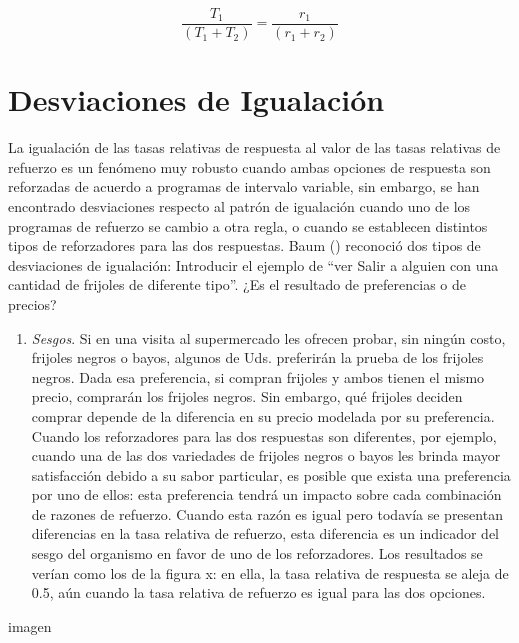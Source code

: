 \documentclass[
  letterpaper,
]{book}
\providecommand{\tightlist}{%
  \setlength{\itemsep}{0pt}\setlength{\parskip}{0pt}}\usepackage{longtable,booktabs,array}
\begin{document}
\[
\frac {T_1} {(T_1 + T_2)} = \frac {r_1} {(r_1 + r_2)}
\]

\section{Desviaciones de
Igualación}\label{desviaciones-de-igualaciuxf3n}

La igualación de las tasas relativas de respuesta al valor de las tasas
relativas de refuerzo es un fenómeno muy robusto cuando ambas opciones
de respuesta son reforzadas de acuerdo a programas de intervalo
variable, sin embargo, se han encontrado desviaciones respecto al patrón
de igualación cuando uno de los programas de refuerzo se cambio a otra
regla, o cuando se establecen distintos tipos de reforzadores para las
dos respuestas. Baum () reconoció dos tipos de desviaciones de
igualación: Introducir el ejemplo de ``ver Salir a alguien con una
cantidad de frijoles de diferente tipo''. ¿Es el resultado de
preferencias o de precios?

\begin{enumerate}
\def\labelenumi{\arabic{enumi}.}
\tightlist
\item
  \emph{Sesgos}. Si en una visita al supermercado les ofrecen probar,
  sin ningún costo, frijoles negros o bayos, algunos de Uds. preferirán
  la prueba de los frijoles negros. Dada esa preferencia, si compran
  frijoles y ambos tienen el mismo precio, comprarán los frijoles
  negros. Sin embargo, qué frijoles deciden comprar depende de la
  diferencia en su precio modelada por su preferencia. Cuando los
  reforzadores para las dos respuestas son diferentes, por ejemplo,
  cuando una de las dos variedades de frijoles negros o bayos les brinda
  mayor satisfacción debido a su sabor particular, es posible que exista
  una preferencia por uno de ellos: esta preferencia tendrá un impacto
  sobre cada combinación de razones de refuerzo. Cuando esta razón es
  igual pero todavía se presentan diferencias en la tasa relativa de
  refuerzo, esta diferencia es un indicador del sesgo del organismo en
  favor de uno de los reforzadores. Los resultados se verían como los de
  la figura x: en ella, la tasa relativa de respuesta se aleja de 0.5,
  aún cuando la tasa relativa de refuerzo es igual para las dos
  opciones.
\end{enumerate}

imagen
\end{document}
